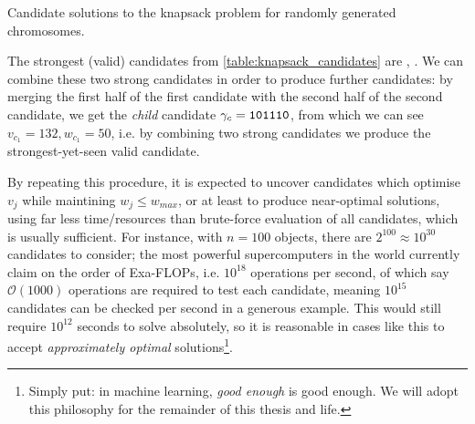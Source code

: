 \begin{table}
    \begin{center}
        
        \caption[Candidate solutions to knapsack problem]{
            Candidate solutions to the knapsack problem for randomly generated chromosomes. 
        }
        \label{table:knapsack_candidates}
    \end{center}
\end{table}

The strongest (valid) candidates from \cref{table:knapsack_candidates} are , . 
We can combine these two strong candidates in order to produce further candidates:
    by merging the first half of the first candidate with the second half of the second candidate\footnotemark,
    we get the \emph{child} candidate $\gamma_{c} = \texttt{101110}$, 
    from which we can see $v_{c_1} = 132, w_{c_1} = 50$, 
    i.e. by combining two strong candidates we produce the strongest-yet-seen valid candidate. 
\par 

By repeating this procedure, it is expected to uncover candidates which optimise $v_j$ while maintining $w_j \leq w_{max}$, 
    or at least to produce near-optimal solutions, using far less time/resources than brute-force evaluation of all candidates, 
    which is usually sufficient. 
For instance, with $n=100$ objects, there are $2^{100} \approx 10^{30}$ candidates to consider; 
    the most powerful supercomputers in the world currently claim on the order of Exa-FLOPs, 
    i.e. $10^{18}$ operations per second, of which say $\mathcal{O}(1000)$ operations are required to test each candidate, 
    meaning $10^{15}$ candidates can be checked per second in a generous example. 
This would still require $10^{12}$ seconds to solve absolutely, 
    so it is reasonable in cases like this to accept 
    \emph{approximately optimal} solutions\footnote{
        Simply put: in machine learning, \emph{good enough} is good enough.
        We will adopt this philosophy for the remainder of this thesis and life. 
    }. 


